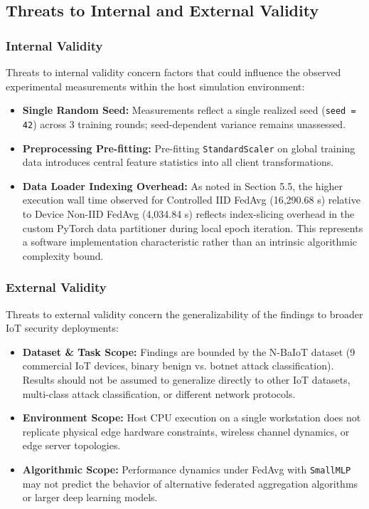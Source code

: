 \documentclass[11pt,a4paper]{article}
\begin{document}
\subsection{Threats to Internal and External Validity}

\subsubsection{Internal Validity}
Threats to internal validity concern factors that could influence the observed experimental measurements within the host simulation environment:

\begin{itemize}
    \item \textbf{Single Random Seed:} Measurements reflect a single realized seed (\texttt{seed = 42}) across 3 training rounds; seed-dependent variance remains unassessed.
    \item \textbf{Preprocessing Pre-fitting:} Pre-fitting \texttt{StandardScaler} on global training data introduces central feature statistics into all client transformations.
    \item \textbf{Data Loader Indexing Overhead:} As noted in Section 5.5, the higher execution wall time observed for Controlled IID FedAvg (16,290.68 s) relative to Device Non-IID FedAvg (4,034.84 s) reflects index-slicing overhead in the custom PyTorch data partitioner during local epoch iteration. This represents a software implementation characteristic rather than an intrinsic algorithmic complexity bound.
\end{itemize}

\subsubsection{External Validity}
Threats to external validity concern the generalizability of the findings to broader IoT security deployments:

\begin{itemize}
    \item \textbf{Dataset \& Task Scope:} Findings are bounded by the N-BaIoT dataset (9 commercial IoT devices, binary benign vs. botnet attack classification). Results should not be assumed to generalize directly to other IoT datasets, multi-class attack classification, or different network protocols.
    \item \textbf{Environment Scope:} Host CPU execution on a single workstation does not replicate physical edge hardware constraints, wireless channel dynamics, or edge server topologies.
    \item \textbf{Algorithmic Scope:} Performance dynamics under FedAvg with \texttt{SmallMLP} may not predict the behavior of alternative federated aggregation algorithms or larger deep learning models.
\end{itemize}
\end{document}
